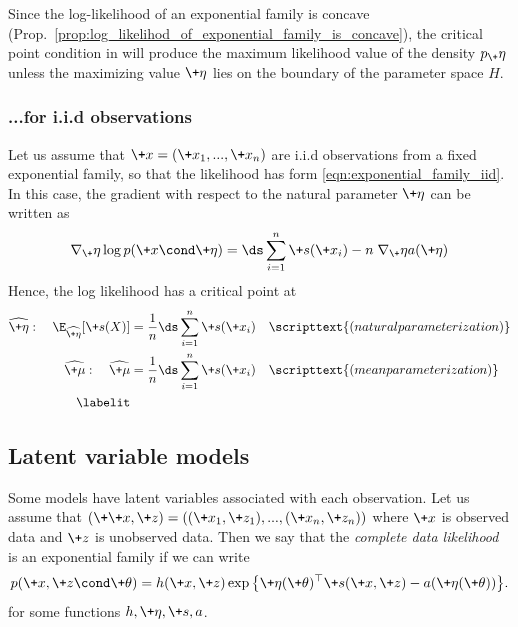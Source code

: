 \documentclass{article} %
\newcommand{\obs}{\+x}
\newcommand{\obsCaps}{X}
\newcommand{\logNormalizerFunction}{a}
\newcommand{\sufficientStatsFunction}{\+s}
\newcommand{\carrierDensity}{h}
\newcommand{\meanParam}{\+\mu}
\newcommand{\param}{\+\theta}
\newcommand{\naturalParam}{\+\eta}
\newcommand{\naturalParamSpace}{H}
\begin{document}
Since the log-likelihood of an exponential family is concave (Prop.~\ref{prop:log_likelihod_of_exponential_family_is_concave}), the critical point condition in  will produce the maximum likelihood value of the density $p_\naturalParam$ unless the maximizing value $\naturalParam$ lies on the boundary of the parameter space $\naturalParamSpace$.


\subsubsection{...for i.i.d observations}

Let us assume that $\+x=(\obs_1, ..., \obs_n)$ are i.i.d observations  from a fixed exponential family, so that the likelihood has form \eqref{eqn:exponential_family_iid}. In this case, the gradient with respect to the natural parameter $\naturalParam$ can be written as
%
\[ \nabla_\naturalParam \log p(\obs \cond \naturalParam) = \ds\sum_{i=1}^n \sufficientStatsFunction(\obs_i) - n \; \nabla_\naturalParam \logNormalizerFunction(\naturalParam) \]
%
Hence, the log likelihood has a critical point at  
%
\begin{align*}
\widehat{\naturalParam} : \quad   \E_{\widehat{\naturalParam}}[\sufficientStatsFunction(\obsCaps)] &= \frac{1}{n} \ds\sum_{i=1}^n \sufficientStatsFunction(\obs_i) && \scripttext{(natural parameterization)} \\
\widehat{\meanParam} : \quad \widehat{\meanParam}&= \frac{1}{n} \ds\sum_{i=1}^n \sufficientStatsFunction(\obs_i) && \scripttext{(mean parameterization)} \\
\labelit \label{eqn:condition_for_critical_point_of_EF_likelihood_under_iid_observations}
\end{align*}
% 
\subsection{Latent variable models}

Some models have latent variables associated with each observation.   Let us  assume that $(\+\obs, \+z)=((\obs_1,\+z_1), ..., (\obs_n, \+z_n))$ where $\+x$ is observed data and $\+z$ is unobserved data.   Then we say that the \textit{complete data likelihood} is an exponential family if we can write
%
\begin{align}
 p(\+x, \+z \cond \param) = \carrierDensity(\+x, \+z) \exp \big\{ \naturalParam(\param)^\top \sufficientStatsFunction(\+x, \+z) - \logNormalizerFunction(\naturalParam(\param))\big\}. 
\label{eqn:exponential_family_complete_data_likelihood}
 \end{align}
%
for some functions $\carrierDensity, \naturalParam, \sufficientStatsFunction, \logNormalizerFunction$. 
\end{document}

